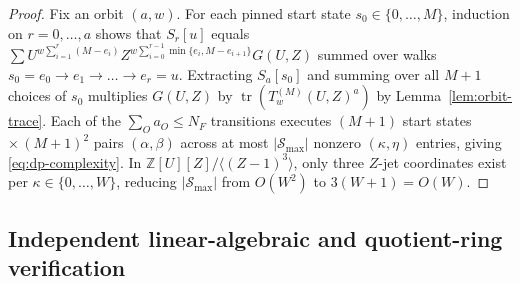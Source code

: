 \documentclass[preprint,12pt]{elsarticle}
\newcommand{\Z}{\mathbb Z}
\newcommand{\tr}{\operatorname{tr}}
\numberwithin{equation}{section}
\theoremstyle{plain}
\theoremstyle{definition}
\theoremstyle{remark}
\begin{document}
\begin{proof}
Fix an orbit $(a,w)$. For each pinned start state $s_0\in\{0,\dots,M\}$, induction
on $r=0,\dots,a$ shows that $S_r[u]$ equals $\sum U^{w\sum_{i=1}^{r}(M-e_i)}
Z^{w\sum_{i=0}^{r-1}\min\{e_i,M-e_{i+1}\}}G(U,Z)$ summed over walks
$s_0=e_0\to e_1\to\dots\to e_r=u$. Extracting $S_a[s_0]$ and summing over all
$M+1$ choices of $s_0$ multiplies $G(U,Z)$ by $\tr(T_w^{(M)}(U,Z)^a)$ by
Lemma~\ref{lem:orbit-trace}. Each of the $\sum_O a_O\le N_F$ transitions executes
$(M+1)$ start states $\times\,(M+1)^2$ pairs $(\alpha,\beta)$ across at most
$|\mathcal S_{\max}|$ nonzero $(\kappa,\eta)$ entries, giving \eqref{eq:dp-complexity}.
In $\Z[U][Z]/\langle(Z-1)^3\rangle$, only three $Z$-jet coordinates exist per
$\kappa\in\{0,\dots,W\}$, reducing $|\mathcal S_{\max}|$ from $O(W^2)$ to $3(W+1)=O(W)$.
\end{proof}

\subsection{Independent linear-algebraic and quotient-ring verification}\label{sec:verification}
\end{document}
